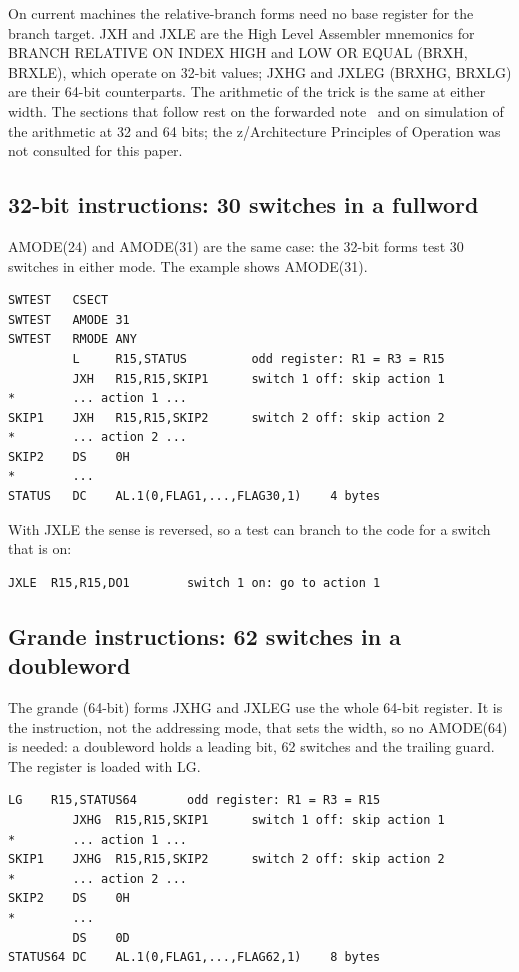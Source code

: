 \documentclass[11pt]{article}
\begin{document}
On current machines the relative-branch forms need no base register for the
branch target. JXH and JXLE are the High Level Assembler mnemonics for BRANCH
RELATIVE ON INDEX HIGH and LOW OR EQUAL (BRXH, BRXLE), which operate on 32-bit
values; JXHG and JXLEG (BRXHG, BRXLG) are their 64-bit counterparts. The
arithmetic of the trick is the same at either width. The sections that follow
rest on the forwarded note~\cite{metz2024} and on simulation of the
arithmetic at 32 and 64 bits; the z/Architecture Principles of Operation was
not consulted for this paper.

\subsection{32-bit instructions: 30 switches in a fullword}

AMODE(24) and AMODE(31) are the same case: the 32-bit forms test 30 switches
in either mode. The example shows AMODE(31).

\begin{Verbatim}[fontsize=\small]
SWTEST   CSECT
SWTEST   AMODE 31
SWTEST   RMODE ANY
         L     R15,STATUS         odd register: R1 = R3 = R15
         JXH   R15,R15,SKIP1      switch 1 off: skip action 1
*        ... action 1 ...
SKIP1    JXH   R15,R15,SKIP2      switch 2 off: skip action 2
*        ... action 2 ...
SKIP2    DS    0H
*        ...
STATUS   DC    AL.1(0,FLAG1,...,FLAG30,1)    4 bytes
\end{Verbatim}

With JXLE the sense is reversed, so a test can branch to the code for a
switch that is on:

\begin{Verbatim}[fontsize=\small]
         JXLE  R15,R15,DO1        switch 1 on: go to action 1
\end{Verbatim}

\subsection{Grande instructions: 62 switches in a doubleword}

The grande (64-bit) forms JXHG and JXLEG use the whole 64-bit register. It is
the instruction, not the addressing mode, that sets the width, so no
AMODE(64) is needed: a doubleword holds a leading bit, 62 switches and the
trailing guard. The register is loaded with LG.

\begin{Verbatim}[fontsize=\small]
         LG    R15,STATUS64       odd register: R1 = R3 = R15
         JXHG  R15,R15,SKIP1      switch 1 off: skip action 1
*        ... action 1 ...
SKIP1    JXHG  R15,R15,SKIP2      switch 2 off: skip action 2
*        ... action 2 ...
SKIP2    DS    0H
*        ...
         DS    0D
STATUS64 DC    AL.1(0,FLAG1,...,FLAG62,1)    8 bytes
\end{Verbatim}
\end{document}

